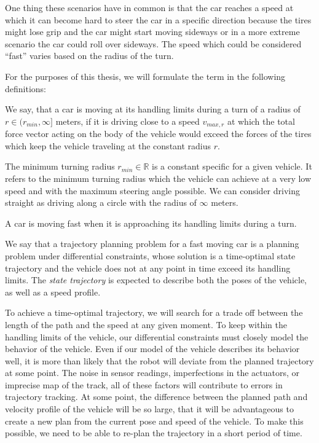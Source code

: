 One thing these scenarios have in common is that the car reaches a speed at which it can become hard to steer the car in a specific direction because the tires might lose grip and the car might start moving sideways or in a more extreme scenario the car could roll over sideways. The speed which could be considered ``fast'' varies based on the radius of the turn.

For the purposes of this thesis, we will formulate the term in the following definitions:

\begin{defn}
	We say, that a car is moving at its handling limits during a turn of a radius of $r\in(r_{min}, \infty]$ meters, if it is driving close to a speed $v_{max,r}$ at which the total force vector acting on the body of the vehicle would exceed the forces of the tires which keep the vehicle traveling at the constant radius $r$.
\end{defn}

The minimum turning radius $r_{min}\in\mathbb{R}$ is a constant specific for a given vehicle. It refers to the minimum turning radius which the vehicle can achieve at a very low speed and with the maximum steering angle possible. We can consider driving straight as driving along a circle with the radius of $\infty$ meters.

\begin{defn}\label{def:fast_moving_car}
	A car is moving fast when it is approaching its handling limits during a turn.
\end{defn}

\begin{defn}
	We say that a trajectory planning problem for a fast moving car is a planning problem under differential constraints, whose solution is a time-optimal state trajectory and the vehicle does not at any point in time exceed its handling limits. The \textit{state trajectory} is expected to describe both the poses of the vehicle, as well as a speed profile.
\end{defn}


To achieve a time-optimal trajectory, we will search for a trade off between the length of the path and the speed at any given moment. To keep within the handling limits of the vehicle, our differential constraints must closely model the behavior of the vehicle. Even if our model of the vehicle describes its behavior well, it is more than likely that the robot will deviate from the planned trajectory at some point. The noise in sensor readings, imperfections in the actuators, or imprecise map of the track, all of these factors will contribute to errors in trajectory tracking. At some point, the difference between the planned path and velocity profile of the vehicle will be so large, that it will be advantageous to create a new plan from the current pose and speed of the vehicle. To make this possible, we need to be able to re-plan the trajectory in a short period of time.

